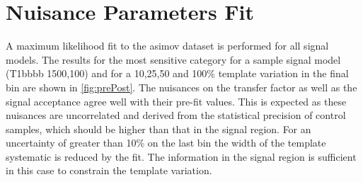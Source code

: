 \clearpage
\section{Nuisance Parameters Fit\label{app:prePostFit}}

A maximum likelihood fit to the asimov dataset is performed for all signal models. 
The results for the most sensitive category for a sample signal model (T1bbbb 1500,100) and for 
a 10,25,50 and 100\% template variation in the final bin are shown in \ref{fig:prePost}. 
The nuisances on the transfer factor as well as the signal acceptance agree 
well with their pre-fit values. This is expected as these nuisances are uncorrelated 
and derived from the statistical precision of control samples, which should be
higher than that in the signal region. For an uncertainty of greater than 10\%
on the last bin the width of the template systematic is reduced by the fit.
The information in the signal region is sufficient in this case
to constrain the template variation. 


